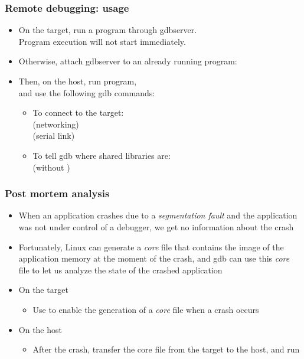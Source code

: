 \begin{frame}
  \frametitle{Remote debugging: usage}
  \begin{itemize}
  \item On the target, run a program through gdbserver.\\
    Program execution will not start immediately.\\
  \item Otherwise, attach gdbserver to an already running program:\\
  \item Then, on the host, run  program,\\
    and use the following gdb commands:
    \begin{itemize}
    \item To connect to the target:\\
       (networking)\\
       (serial link)
    \item To tell gdb where shared libraries are:\\
       (without )
    \end{itemize}
  \end{itemize}
\end{frame}

\begin{frame}
  \frametitle{Post mortem analysis}
  \begin{itemize}
  \item When an application crashes due to a {\em segmentation fault}
    and the application was not under control of a debugger, we get no
    information about the crash
  \item Fortunately, Linux can generate a {\em core} file that
    contains the image of the application memory at the moment of the
    crash, and gdb can use this {\em core} file to let us analyze the
    state of the crashed application
  \item On the target
    \begin{itemize}
    \item Use  to enable the generation of a
      {\em core} file when a crash occurs
    \end{itemize}
  \item On the host
    \begin{itemize}
    \item After the crash, transfer the core file from the target to
      the host, and run
    \end{itemize}
  \end{itemize}
\end{frame}

